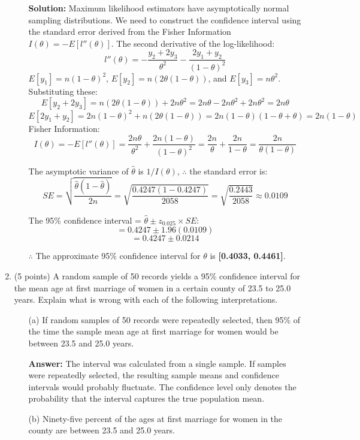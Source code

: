\documentclass[12pt,letterpaper]{article}
\begin{document}
\begin{enumerate}[leftmargin=*]
\begin{itemize}
 \textbf{Solution:}
 Maximum likelihood estimators have asymptotically normal sampling distributions. We need to construct the confidence interval using the standard error derived from the Fisher Information $I(\theta) = -E[l''(\theta)]$.
 The second derivative of the log-likelihood:
 \[ l''(\theta) = -\frac{y_2 + 2y_3}{\theta^2} - \frac{2y_1 + y_2}{(1-\theta)^2} \]
 $E[y_1] = n(1-\theta)^2$, $E[y_2] = n(2\theta(1-\theta))$, and $E[y_3] = n\theta^2$. 
 Substituting these:
 \[ E[y_2 + 2y_3] = n(2\theta(1-\theta)) + 2n\theta^2 = 2n\theta - 2n\theta^2 + 2n\theta^2 = 2n\theta \]
 \[ E[2y_1 + y_2] = 2n(1-\theta)^2 + n(2\theta(1-\theta)) = 2n(1-\theta)(1-\theta+\theta) = 2n(1-\theta) \]
 Fisher Information:
 \[ I(\theta) = -E[l''(\theta)] = \frac{2n\theta}{\theta^2} + \frac{2n(1-\theta)}{(1-\theta)^2} = \frac{2n}{\theta} + \frac{2n}{1-\theta} = \frac{2n}{\theta(1-\theta)} \]
 
 The asymptotic variance of $\hat{\theta}$ is $1/I(\theta)$, $\therefore$ the standard error is:
 \[ SE = \sqrt{\frac{\hat{\theta}(1-\hat{\theta})}{2n}} = \sqrt{\frac{0.4247(1 - 0.4247)}{2058}} = \sqrt{\frac{0.2443}{2058}} \approx 0.0109 \]
 
 The 95\% confidence interval = $\hat{\theta} \pm z_{0.025} \times SE$:
 \[= 0.4247 \pm 1.96(0.0109) \]
 \[= 0.4247 \pm 0.0214 \]
 
 $\therefore$ The approximate 95\% confidence interval for $\theta$ is \textbf{[0.4033, 0.4461]}.
\end{itemize} 

\item (5 points) A random sample of 50 records yields a 95$\%$ confidence interval for the mean age at first marriage of women in a certain county of 23.5 to 25.0 years. Explain what is wrong with each of the following interpretations.

\begin{itemize}
	\item[(a)] If random samples of 50 records were repeatedly selected, then 95$\%$ of the time the sample mean age at first marriage for women would be between 23.5 and 25.0 years.
 
 \textbf{Answer:} The interval was calculated from a single sample. If samples were repeatedly selected, the resulting sample means and confidence intervals would probably fluctuate. The confidence level only denotes the probability that the interval captures the true population mean.
 
	\item[(b)] Ninety-five percent of the ages at first marriage for women in the county are between 23.5 and 25.0 years.
 

\end{itemize}
\end{enumerate}
\end{document}
